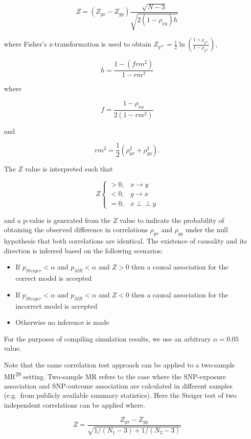 \documentclass[]{article}
\providecommand{\tightlist}{%
  \setlength{\itemsep}{0pt}\setlength{\parskip}{0pt}}
\begin{document}
\[
Z = (Z_{gx} - Z_{gy}) \frac{\sqrt{N-3}}{\sqrt{2(1-\rho_{xy})h}}
\]

where Fisher's z-transformation is used to obtain
\(Z_{g*} = \frac{1}{2} \ln \left ( \frac{1+\rho_{g*}}{1-\rho_{g*}} \right )\),

\[
h = \frac{1 - (frm^2)} {1 - rm^2}
\]

where

\[
f = \frac{1 - \rho_{xy}}{2(1 - rm^2)}
\]

and

\[
rm^2 = \frac{1}{2}(\rho_{gx}^2 + \rho_{gy}^2).
\]

The \(Z\) value is interpreted such that

\[
Z \left\{
\begin{array}{ll}
> 0, & x \to y\\
< 0, & y \to x\\
= 0, & x \perp\!\!\!\perp y 
\end{array} \right.
\]

and a p-value is generated from the \(Z\) value to indicate the
probability of obtaining the observed difference in correlations
\(\rho_{gx}\) and \(\rho_{gy}\) under the null hypothesis that both
correlations are identical. The existence of causality and its direction
is inferred based on the following scenarios:

\begin{itemize}
\tightlist
\item
  If \(p_{Steiger} < \alpha\) and \(p_{MR} < \alpha\) and \(Z > 0\) then
  a causal association for the correct model is accepted
\item
  If \(p_{Steiger} < \alpha\) and \(p_{MR} < \alpha\) and \(Z < 0\) then
  a causal association for the incorrect model is accepted
\item
  Otherwise no inference is made
\end{itemize}

For the purposes of compiling simulation results, we use an arbitrary
\(\alpha = 0.05\) value.

Note that the same correlation test approach can be applied to a
two-sample MR\textsuperscript{29} setting. Two-sample MR refers to the
case where the SNP-exposure association and SNP-outcome association are
calculated in different samples (e.g.~from publicly available summary
statistics). Here the Steiger test of two independent correlations can
be applied where.

\[
Z = \frac{Z_{gx} - Z_{gy}} { \sqrt{ 1 / (N_{1} - 3) + 1 / (N_{2} - 3) } }
\]
\end{document}
